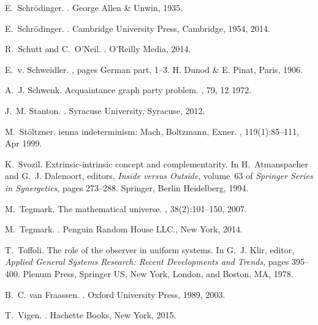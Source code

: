 \documentclass[12pt]{article}
\begin{document}
\begin{thebibliography}{10}
E.~Schr\"odinger.
.
\newblock George Allen \& Unwin, 1935.

E.~Schr{\"{o}}dinger.
.
\newblock Cambridge University Press, Cambridge, 1954, 2014.

R.~Schutt and C.~O'Neil.
.
\newblock O'Reilly Media, 2014.

E.~v. Schweidler.
, pages
  German part, 1--3.
\newblock H. Dunod \& E. Pinat, Paris, 1906.

A.~J. Schwenk.
\newblock Acquaintance graph party problem.
, 79, 12 1972.

J.~M. Stanton.
.
\newblock Syracuse University, Syracuse, 2012.

M.~St{\"o}ltzner.
ienna indeterminism: {M}ach, {B}oltzmann, {E}xner.
, 119(1):85--111, Apr 1999.

K.~Svozil.
\newblock Extrinsic-intrinsic concept and complementarity.
\newblock In H.~Atmanspacher and G.~J. Dalenoort, editors, {\em Inside versus
  Outside}, volume~63 of {\em Springer Series in Synergetics}, pages 273--288.
  Springer, Berlin Heidelberg, 1994.

M.~Tegmark.
\newblock The mathematical universe.
, 38(2):101--150, 2007.

M.~Tegmark.
.
\newblock Penguin Random House LLC., New York, 2014.

T.~Toffoli.
\newblock The role of the observer in uniform systems.
\newblock In G.~J. Klir, editor, {\em Applied General Systems Research: Recent
  Developments and Trends}, pages 395--400. Plenum Press, Springer US, New
  York, London, and Boston, MA, 1978.

B.~C. van Fraassen.
.
\newblock Oxford University Press, 1989, 2003.

T.~Vigen.
.
\newblock Hachette Books, New York, 2015.


\end{thebibliography}
\end{document}
